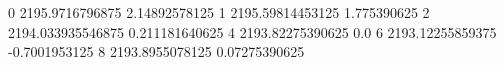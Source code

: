 0 2195.9716796875 2.14892578125
1 2195.59814453125 1.775390625
2 2194.033935546875 0.211181640625
4 2193.82275390625 0.0
6 2193.12255859375 -0.7001953125
8 2193.8955078125 0.07275390625
